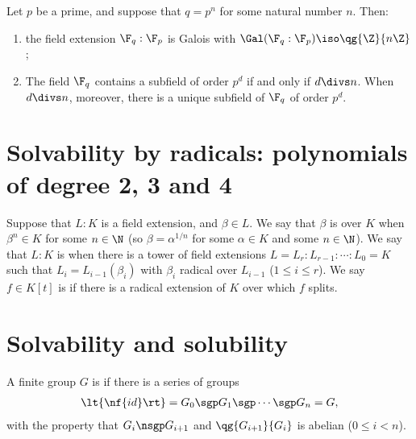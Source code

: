 \documentclass{article}
\begin{document}
  \begin{theorem}
    Let $ p $ be a prime, and suppose that $ q=p^n $ for some natural number $ n $.
    Then: \begin{enumerate}[label=(\alph*)]
      \item the field extension $ \F_q:\F_p $ is Galois with $ \Gal(\F_q:\F_p)\iso \qg{\Z}{n\Z} $;
      \item The field $ \F_q $ contains a subfield of order $ p^d $ if and only if $ d\divs n $.
        When $ d\divs n $, moreover, there is a unique subfield of $ \F_q $ of order $ p^d $.
    \end{enumerate}
  \end{theorem}

\section{Solvability by radicals: polynomials of degree 2, 3 and 4}
  \begin{definition}
    Suppose that $ L:K $ is a field extension, and $ \beta\in L $.
    We say that $ \beta $ is  over $ K $ when $ \beta^n\in K $ for some $ n\in \N $ (so $ \beta=\alpha^{1/n} $ for some $ \alpha\in K $ and some $ n\in\N $).
    We say that $ L:K $ is  when there is a tower of field extensions $ L=L_r:L_{r-1}:\cdots:L_0=K $ such that $ L_i=L_{i-1}(\beta_i) $ with $ \beta_i $ radical over $ L_{i-1} $ ($ 1\leq i\leq r $).
    We say $ f\in K[t] $ is  if there is a radical extension of $ K $ over which $ f $ splits.
  \end{definition}

\section{Solvability and solubility}
  \begin{definition}
    A finite group $ G $ is  if there is a series of groups \begin{align*}
      \lt\{ \nf{id} \rt\} = G_0 \sgp G_1 \sgp \cdots\sgp G_n = G,
    \end{align*}
    with the property that $ G_i \nsgp G_{i+1} $ and $ \qg{G_{i+1}}{G_i} $ is abelian ($ 0\leq i < n $).
  \end{definition}
\end{document}
